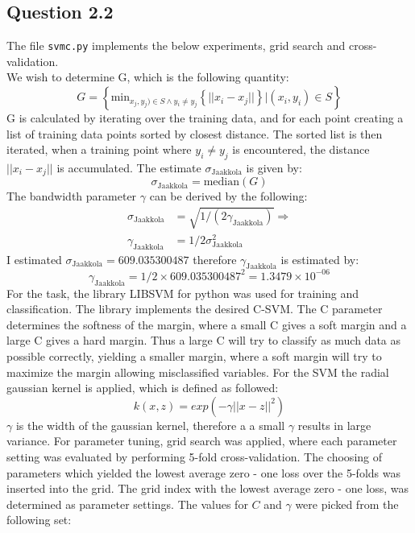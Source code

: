 \documentclass{article}
\begin{document}
\subsection{Question 2.2}
The file \texttt{svmc.py} implements the below experiments, grid search and cross-validation. \\
We wish to determine G, which is the following quantity:
\begin{equation}
G = \left\lbrace \text{min}_{x_j,y_j) \in S \wedge y_i \neq y_j}
\left\lbrace || x_i - x_j || \right\rbrace | (x_i,y_i) \in S \right\rbrace 
\end{equation}
G is calculated by iterating over the training data, and for each point creating a list of training data points sorted by closest distance. The sorted list is then iterated, when a training point where $y_i \neq y_j$ is encountered, the distance $||x_i-x_j||$ is accumulated. The estimate $\sigma_{\text{Jaakkola}}$ is given by:
\begin{equation}
\sigma_{\text{Jaakkola}} = \text{median}(G)
\end{equation}
The bandwidth parameter $\gamma$ can be derived by the following:
\begin{align*}
\sigma_{\text{Jaakkola}} &= \sqrt{1 / (2\gamma_{\text{Jaakkola}})} \Rightarrow \\
\gamma_{\text{Jaakkola}} &= 1/2\sigma^2_{\text{Jaakkola}}
\end{align*}
I estimated $\sigma_{\text{Jaakkola}} = 609.035300487$
therefore $\gamma_{\text{Jaakkola}}$ is estimated by:
\begin{equation}
\gamma_{\text{Jaakkola}} = 1 / 2 \times 609.035300487^2 = 1.3479 \times 10^{-06}
\end{equation}
For the task, the library LIBSVM for python was used for training and classification. The library implements the desired C-SVM. The C parameter determines the softness of the margin, where a small C gives a soft margin and a large C gives a hard margin. Thus a large C will try to classify as much data as possible correctly, yielding a smaller margin, where a soft margin will try to maximize the margin allowing misclassified variables. For the SVM the radial gaussian kernel is applied, which is defined as followed:
\begin{equation}
k(x,z) = exp(-\gamma || x - z ||^2)
\end{equation}
$\gamma$ is the width of the gaussian kernel, therefore a a small $\gamma$ results in large variance. For parameter tuning, grid search was applied, where each parameter setting was evaluated by performing 5-fold cross-validation. The choosing of parameters which yielded the lowest average zero - one loss over the 5-folds was inserted into the grid. The grid index with the lowest average zero - one loss, was determined as parameter settings. The values for $C$ and $\gamma$ were picked from the following set:
\end{document}
